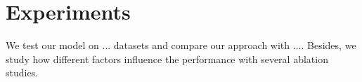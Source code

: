 
\section{Experiments}


We test our model on $\dots{}$ datasets 
and compare our approach with $\dots{}$. Besides, we 
study how different factors influence the performance with 
several ablation studies.




